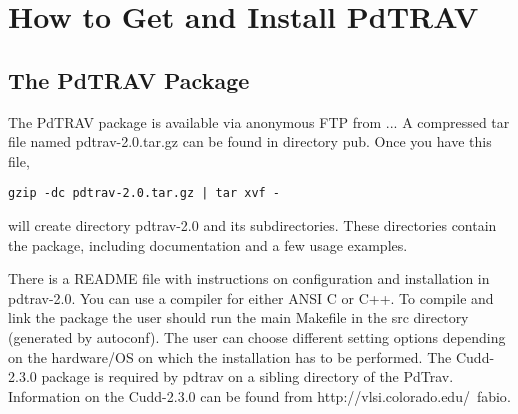 
\section{How to Get and Install PdTRAV} 


\subsection{The PdTRAV Package} 

The PdTRAV package is available via anonymous FTP from ...
A compressed tar file named pdtrav-2.0.tar.gz can be found in directory 
pub.
Once you have this file, 
\begin{verbatim}
gzip -dc pdtrav-2.0.tar.gz | tar xvf - 
\end{verbatim}
will create directory pdtrav-2.0 and its subdirectories.
These directories contain the package, including documentation and a few usage
examples.

There is a README file with instructions on configuration and installation
in pdtrav-2.0. 
You can use a compiler for either ANSI C or C++. 
To compile and link the package the user should run the main {\sf Makefile}
in the src directory (generated by autoconf).
The user can choose different setting options depending on
the hardware/OS on which the installation has to be performed.
The {\sf Cudd-2.3.0} package is required by pdtrav
on a sibling directory of the PdTrav.
Information on the {\sf Cudd-2.3.0} can be found from
{\sf http://vlsi.colorado.edu/~fabio}.

